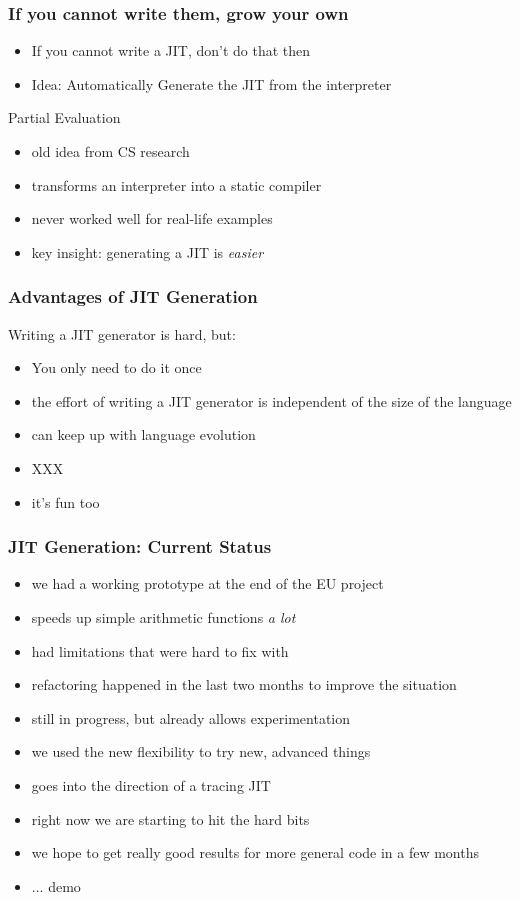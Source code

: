\documentclass[utf8x]{beamer}
\begin{document}
\begin{frame}
\begin{frame}
  \frametitle{If you cannot write them, grow your own}
  \begin{itemize}
  \item If you cannot write a JIT, don't do that then
  \pause
  \item Idea: Automatically Generate the JIT from the interpreter
  \pause
  \end{itemize}
  \begin{block}{
    Partial Evaluation}
    \begin{itemize}
    \item old idea from CS research
    \item transforms an interpreter into a static compiler
    \item never worked well for real-life examples
    \item key insight: generating a JIT is \emph{easier}
    \end{itemize}
  \end{block}
 
\end{frame}

\begin{frame}
  \frametitle{Advantages of JIT Generation}
  Writing a JIT generator is hard, but:
  \begin{itemize}
  \item You only need to do it once
  \item the effort of writing a JIT generator is independent of the size of the language
  \item can keep up with language evolution
  \item XXX
  \item it's fun too
  \end{itemize}
\end{frame}

\begin{frame}
  \frametitle{JIT Generation: Current Status}
  \begin{itemize}
  \item we had a working prototype at the end of the EU project
  \item speeds up simple arithmetic functions \emph{a lot}
  \item had limitations that were hard to fix with
  \pause
  \item refactoring happened in the last two months to improve the situation
  \item still in progress, but already allows experimentation
  \item we used the new flexibility to try new, advanced things
  \item goes into the direction of a tracing JIT
  \item right now we are starting to hit the hard bits
  \item we hope to get really good results for more general code in a few months
  \item ... demo
  \end{itemize}
\end{frame}


\end{frame}
\end{document}
